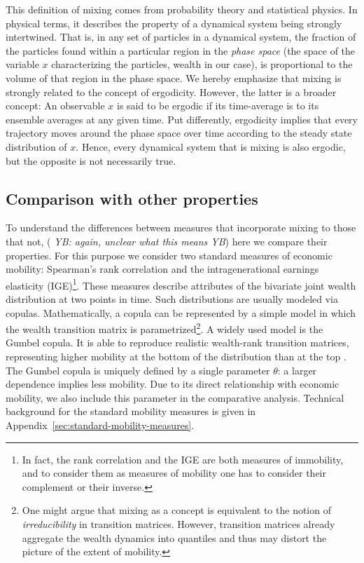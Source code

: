 \documentclass[11pt]{article}
\newcommand{\red}[1]{{\color{red} #1}}
\newcommand{\blue}[1]{{\color{blue} #1}}
\newcommand{\YB}[1]{\blue{{\it YB: #1 YB}}}
\numberwithin{equation}{section}
\begin{document}
This definition of mixing comes from probability theory and statistical physics. In physical terms, it describes the property of a dynamical system being strongly intertwined. That is, in any set of particles in a dynamical system, the fraction of the particles found within a particular region in the \textit{phase space} (the space of the variable $x$ characterizing the particles, wealth in our case), is proportional to the volume of that region in the phase space. We hereby emphasize that mixing is strongly related to the concept of ergodicity. However, the latter is a broader concept: An observable $x$ is said to be ergodic if its time-average is to its ensemble averages at any given time. Put differently, ergodicity implies that every trajectory moves around the phase space over time according to the steady state distribution of $x$. Hence, every dynamical system that is mixing is also ergodic, but the opposite is not necessarily true.

\subsection{Comparison with other properties}

To understand the differences between measures that incorporate mixing to those that not, (\YB{again, unclear what this means}) here we compare their properties. For this purpose we consider two standard measures of economic mobility: Spearman's rank correlation and the intragenerational earnings elasticity (IGE)\footnote{In fact, the rank correlation and the IGE are both measures of immobility, and to consider them as measures of mobility one has to consider their complement or their inverse.}. These measures describe attributes of the bivariate joint wealth distribution at two points in time. Such distributions are usually modeled via copulas. Mathematically, a copula can be represented by a simple model in which the wealth transition matrix is parametrized\footnote{\red{One might argue that mixing as a concept is equivalent to the notion of \textit{irreducibility} in transition matrices. However, transition matrices already aggregate the wealth dynamics into quantiles and thus may distort the picture of the extent of mobility.}}. A widely used model is the Gumbel copula. It is able to reproduce realistic wealth-rank transition matrices, representing higher mobility at the bottom of the distribution than at the top \citep{JanttiJenkins2015}. The Gumbel copula is uniquely defined by a single parameter $\theta$: a larger dependence implies less mobility. Due to its direct relationship with economic mobility, we also include this parameter in the comparative analysis. Technical background for the standard mobility measures is given in Appendix~\ref{sec:standard-mobility-measures}.
\end{document}
